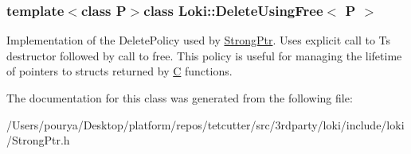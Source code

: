 \subsubsection*{template$<$class P$>$class Loki\+::\+Delete\+Using\+Free$<$ P $>$}

Implementation of the Delete\+Policy used by \hyperlink{classLoki_1_1StrongPtr}{Strong\+Ptr}. Uses explicit call to T\textquotesingle{}s destructor followed by call to free. This policy is useful for managing the lifetime of pointers to structs returned by \hyperlink{classC}{C} functions. 

The documentation for this class was generated from the following file\+:\begin{DoxyCompactItemize}
\item 
/\+Users/pourya/\+Desktop/platform/repos/tetcutter/src/3rdparty/loki/include/loki/Strong\+Ptr.\+h\end{DoxyCompactItemize}
